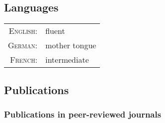 \subsection*{Languages}
\begin{tabular}{rl}
	\textsc{English:}& fluent\\
	\textsc{German:}& mother tongue\\
	\textsc{French:}& intermediate 
\end{tabular}

\subsection*{Publications}


\subsubsection*{Publications in peer-reviewed journals}

